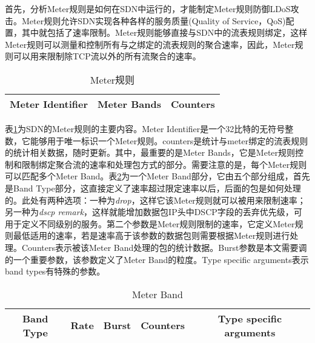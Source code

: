 首先，分析Meter规则是如何在SDN中运行的，才能制定Meter规则防御LDoS攻击。Meter规则允许SDN实现各种各样的服务质量(Quality of Service，QoS)配置，其中就包括了速率限制。Meter规则能够直接与SDN中的流表规则绑定，这样Meter规则可以测量和控制所有与之绑定的流表规则的聚合速率，因此，Meter规则可以用来限制除TCP流以外的所有流聚合的速率。

\begin{table}[htbp]
	\centering  %
	\caption{Meter规则}  %
	\label{table:meter}  %
	\begin{tabular}{|c|c|c|}  
		\hline  %
        Meter Identifier & Meter Bands& Counters \\  %
        \hline
		
	\end{tabular}
\end{table}
表\ref{table:meter}为SDN的Meter规则的主要内容。Meter Identifier是一个32比特的无符号整数，它能够用于唯一标识一个Meter规则。counters是统计与meter绑定的流表规则的统计相关数据，随时更新。其中，最重要的是Meter Bands，它是Meter规则控制和限制绑定聚合流的速率和处理包方式的部分。需要注意的是，每个Meter规则可以匹配多个Meter Band。表\ref{table:meterbands}为一个Meter Band部分，它由五个部分组成，首先是Band Type部分，这直接定义了速率超过限定速率以后，后面的包是如何处理的。此处有两种选项：一种为\emph{drop}，这样它该Meter规则就可以被用来限制速率；另一种为\emph{dscp remark}，这样就能增加数据包IP头中DSCP字段的丢弃优先级，可用于定义不同级别的服务。第二个参数是Meter规则限制的速率，它定义Meter规则最低适用的速率，若是速率高于该参数的数据包则需要根据Meter规则进行处理。Counters表示被该Meter Band处理的包的统计数据。Burst参数是本文需要调的一个重要参数，该参数定义了Meter Band的粒度。Type specific arguments表示band types有特殊的参数。

\begin{table}[htbp]
	\centering  %
	\caption{Meter Band}  %
	\label{table:meterbands}  %
	\begin{tabular}{|c|c|c|c|c|}  
		\hline  %
        Band Type & Rate & Burst & Counters & Type specific arguments \\  %
        \hline
		
	\end{tabular}
\end{table}

